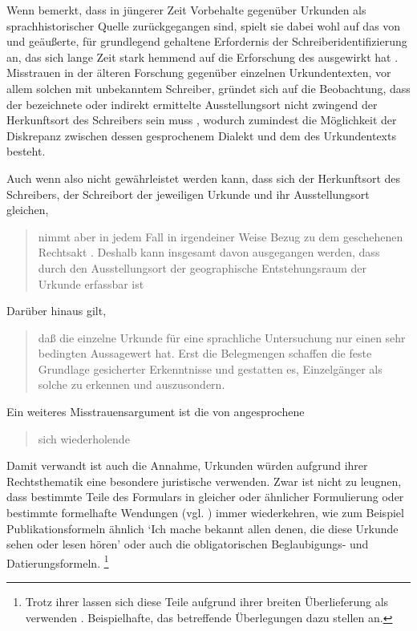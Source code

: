 Wenn \citeauthor{schulze2011} bemerkt, dass in jüngerer Zeit Vorbehalte
gegenüber Urkunden als sprachhistorischer Quelle zurückgegangen sind, spielt
sie dabei wohl auf das von \citet[23--33]{boesch1946} und
\citet[389]{haacke1955} geäußerte, für grundlegend gehaltene Erfordernis der
Schrei\-ber\-identifizierung an, das sich lange
Zeit stark hemmend auf die Erforschung des \CAO{} ausgewirkt hat
\autocite[21--22]{schulze2011}. Misstrauen in der älteren Forschung gegenüber
einzelnen Urkunden\-texten, vor allem solchen mit unbekanntem Schreiber,
gründet sich auf die Beobachtung, dass der bezeichnete oder indirekt ermittelte
Ausstellungsort nicht zwingend der Herkunftsort des Schreibers sein muss
\autocite[16]{schulze2011}, wodurch zumindest die Möglichkeit der Diskrepanz
zwischen dessen gesprochenem Dialekt und dem  des
Urkundentexts besteht.

Auch wenn also nicht gewährleistet werden kann, dass sich der Herkunftsort des
Schreibers, der Schreibort der jeweiligen Urkunde
und ihr Ausstellungsort gleichen,
\blockcquote[331--332]{ganslmayeretal2003}{nimmt 
aber in jedem Fall in irgendeiner Weise Bezug zu dem geschehenen Rechtsakt
\textelp{}. Deshalb kann insgesamt davon ausgegangen werden, dass durch den
Ausstellungsort der geographische Entstehungsraum der
Urkunde erfassbar ist}. Darüber hinaus gilt, \blockcquote[122]{deboor1974}{daß
die einzelne Urkunde für eine sprachliche Untersuchung nur einen sehr bedingten
Aussagewert hat. Erst die Belegmengen schaffen die feste Grundlage gesicherter
Erkenntnisse und gestatten es, Einzelgänger als solche zu erkennen und
auszusondern.}

Ein weiteres Misstrauensargument ist die von \citet[1311]{wegera2000}
angesprochene \blockquote{sich wiederholende }. Damit
verwandt ist auch die Annahme, Urkunden würden aufgrund ihrer Rechtsthematik
eine besondere juristische  verwenden. Zwar ist nicht zu
leugnen, dass bestimmte Teile des Formulars in gleicher oder ähnlicher
Formulierung oder bestimmte formelhafte Wendungen (vgl.
) immer wiederkehren, wie zum Beispiel
Publikationsformeln ähnlich  `Ich mache bekannt allen denen, die diese Urkunde sehen
oder lesen hören' oder auch die obligatorischen Beglaubigungs- und
Datierungsformeln.%
%
	\footnote{%
	Trotz ihrer  lassen sich diese Teile aufgrund ihrer
	breiten Überlieferung als  verwenden
	\autocite[siehe][]{cysouwwaelchli2007}. Beispielhafte, das \CAO{}
	betreffende Überlegungen dazu stellen
	\citet[174--175]{beckerschallert2022b} an.}

